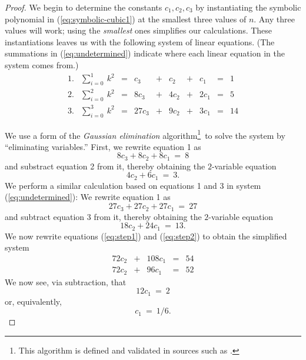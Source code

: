 {\begin{proof}
We begin to determine the constants $c_1, c_2, c_3$ by instantiating the symbolic polynomial in (\ref{eq:symbolic-cubic1}) at the smallest three values of $n$.  Any three values will work; using
the {\em smallest} ones simplifies our calculations.  These instantiations leaves us with the following system of linear equations.  (The summations in (\ref{eq:undetermined}) indicate where
each linear equation in the system comes from.)
\begin{equation}
\label{eq:undetermined}
\begin{array}{lccccccccc}
1. &
{\displaystyle \sum_{i=0}^1 \ k^2}
   & = & c_3    & + & c_2   & + & c_1   & = & 1 \\
2. &
{\displaystyle \sum_{i=0}^2 \ k^2}
   & = & 8 c_3  & + & 4 c_2 & + & 2 c_1 & = & 5 \\
3. &
{\displaystyle \sum_{i=0}^3 \ k^2}
   & = & 27 c_3 & + & 9 c_2 & + & 3 c_1 & = & 14
\end{array}
\end{equation}

We use a form of the {\it Gaussian elimination} algorithm\footnote{This algorithm is defined and validated in sources such as \cite{CLRS}.}~to solve the system by ``eliminating variables.''  First, we rewrite equation 1 as
\[ 8 c_3 + 8 c_2 + 8 c_1 \ = \ 8 \]
and substract equation 2 from it, thereby obtaining the $2$-variable equation
\begin{equation}
\label{eq:step1}
4c_2 + 6 c_1 \ = \ 3.
\end{equation}
We perform a similar calculation based on equations 1 and 3 in system (\ref{eq:undetermined}):  We rewrite equation 1 as
\[ 27 c_3 + 27 c_2 + 27 c_1 \ = \ 27 \]
and subtract equation 3 from it, thereby obtaining the $2$-variable equation
\begin{equation}
\label{eq:step2}
18 c_2 + 24 c_1 \ = \ 13.
\end{equation}
We now rewrite equations (\ref{eq:step1}) and (\ref{eq:step2}) to obtain the simplified system
\[
\begin{array}{ccccc}
72 c_2 & + & 108 c_1 & = & 54 \\
72 c_2 & + &  96 c_1 & = & 52
\end{array}
\]
We now see, via subtraction, that
\[ 12 c_1 \ = \ 2 \]
or, equivalently,
\begin{equation}
\label{eq:valueof-c1}
c_1 \ = \ 1/6.
\end{equation}


\end{proof}}
